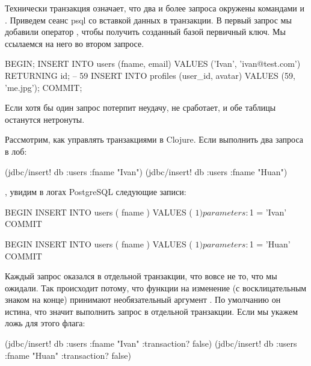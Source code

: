 Технически транзакция означает, что два и более запроса окружены командами  и . Приведем сеанс psql со вставкой данных в транзакции. В первый запрос мы добавили оператор , чтобы получить созданный базой первичный ключ. Мы ссылаемся на него во втором запросе.

\begin{english}
  \begin{sql}
BEGIN;
INSERT INTO users (fname, email) VALUES ('Ivan', 'ivan@test.com') RETURNING id;
-- 59
INSERT INTO profiles (user_id, avatar) VALUES (59, 'me.jpg');
COMMIT;
  \end{sql}
\end{english}

Если хотя бы один запрос потерпит неудачу,  не сработает, и обе таблицы останутся нетронуты.

Рассмотрим, как управлять транзакциями в Clojure. Если выполнить два запроса в лоб:

\begin{english}
  \begin{clojure}
(jdbc/insert! db :users {:fname "Ivan"})
(jdbc/insert! db :users {:fname "Huan"})
  \end{clojure}
\end{english}

\noindent
, увидим в логах PostgreSQL следующие записи:

\begin{english}
  \begin{sql}
BEGIN
INSERT INTO users ( fname ) VALUES ( $1 )
parameters: $1 = 'Ivan'
COMMIT

BEGIN
INSERT INTO users ( fname ) VALUES ( $1 )
parameters: $1 = 'Huan'
COMMIT
  \end{sql}
\end{english}

Каждый запрос оказался в отдельной транзакции, что вовсе не то, что мы ожидали. Так происходит потому, что функции на изменение (с восклицательным знаком на конце) принимают необязательный аргумент . По умолчанию он истина, что значит выполнить запрос в отдельной транзакции. Если мы укажем ложь для этого флага:

\begin{english}
  \begin{clojure}
(jdbc/insert! db :users {:fname "Ivan"} {:transaction? false})
(jdbc/insert! db :users {:fname "Huan"} {:transaction? false})
  \end{clojure}
\end{english}

